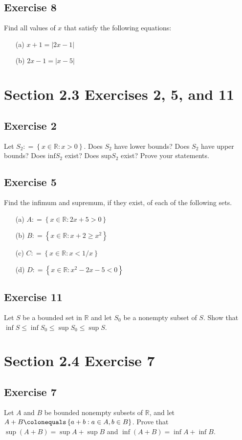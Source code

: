 \documentclass[12pt]{article}
\begin{document}
\begin{flushleft}
\subsection*{Exercise 8}
Find all values of $x$ that satisfy the following equations:
\begin{itemize}
\item[(a)] $x + 1 = \left|2x - 1\right|$
\item[(b)] $2x - 1 = \left|x - 5\right|$
\end{itemize}

\section*{Section 2.3 Exercises 2, 5, and 11}

\subsection*{Exercise 2}
Let $S_2 \mathrel{\mathop:}= \left\{x \in \mathbb{R} : x > 0\right\}$. Does $S_2$ have lower bounds? Does $S_2$ have upper bounds? Does $\text{inf}S_2$ exist? Does $\text{sup}S_2$ exist? Prove your statements.

\subsection*{Exercise 5}
Find the infimum and supremum, if they exist, of each of the following sets.
\begin{itemize}
\item[(a)] $A \mathrel{\mathop:}= \left\{x \in \mathbb{R} : 2x + 5 > 0\right\}$
\item[(b)] $B \mathrel{\mathop:}= \left\{x \in \mathbb{R} : x + 2 \geq x^2\right\}$
\item[(c)] $C \mathrel{\mathop:}= \left\{x \in \mathbb{R} : x < 1/x\right\}$
\item[(d)] $D \mathrel{\mathop:}= \left\{x \in \mathbb{R} : x^2 - 2x - 5 < 0\right\}$
\end{itemize}

\subsection*{Exercise 11}
Let $S$ be a bounded set in $\mathbb{R}$ and let $S_0$ be a nonempty subset of $S$. Show that $\inf S \leq \inf S_0 \leq \sup S_0 \leq \sup S$.

\section*{Section 2.4 Exercise 7}

\subsection*{Exercise 7}

Let $A$ and $B$ be bounded nonempty subsets of $\mathbb{R}$, and let $A + B \colonequals \left\{a + b : a \in A, b \in B\right\}$. Prove that $\sup\left(A + B\right) = \sup A + \sup B$ and $\inf \left(A + B\right) = \inf A + \inf B$.

\end{flushleft}
\end{document}
